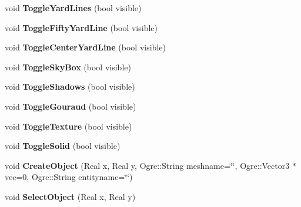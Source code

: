 \begin{DoxyCompactItemize}
\item 
\hypertarget{class_p_f_b_application_a4b296aa04f842d084c74fe3a8fe6df18}{
void {\bfseries ToggleYardLines} (bool visible)}
\label{class_p_f_b_application_a4b296aa04f842d084c74fe3a8fe6df18}

\item 
\hypertarget{class_p_f_b_application_aacff371d8a9b6d9068a855173434a7eb}{
void {\bfseries ToggleFiftyYardLine} (bool visible)}
\label{class_p_f_b_application_aacff371d8a9b6d9068a855173434a7eb}

\item 
\hypertarget{class_p_f_b_application_a6da1667cdc10e69d3ca21edfce3622f7}{
void {\bfseries ToggleCenterYardLine} (bool visible)}
\label{class_p_f_b_application_a6da1667cdc10e69d3ca21edfce3622f7}

\item 
\hypertarget{class_p_f_b_application_acd95785fc2796c2fc470238dda61abdb}{
void {\bfseries ToggleSkyBox} (bool visible)}
\label{class_p_f_b_application_acd95785fc2796c2fc470238dda61abdb}

\item 
\hypertarget{class_p_f_b_application_a461aab080d5d3e152da81627383692ba}{
void {\bfseries ToggleShadows} (bool visible)}
\label{class_p_f_b_application_a461aab080d5d3e152da81627383692ba}

\item 
\hypertarget{class_p_f_b_application_a18e5368ea7e620c6fd6a844d7124b36f}{
void {\bfseries ToggleGouraud} (bool visible)}
\label{class_p_f_b_application_a18e5368ea7e620c6fd6a844d7124b36f}

\item 
\hypertarget{class_p_f_b_application_a8a39b368b7f08d09da73f4ec82087912}{
void {\bfseries ToggleTexture} (bool visible)}
\label{class_p_f_b_application_a8a39b368b7f08d09da73f4ec82087912}

\item 
\hypertarget{class_p_f_b_application_ad89e74af65b66b3b4a9adf05c99935bb}{
void {\bfseries ToggleSolid} (bool visible)}
\label{class_p_f_b_application_ad89e74af65b66b3b4a9adf05c99935bb}

\item 
\hypertarget{class_p_f_b_application_a9a5b3ddee4927228bc3f39ca805d518f}{
void {\bfseries CreateObject} (Real x, Real y, Ogre::String meshname=\char`\"{}\char`\"{}, Ogre::Vector3 $\ast$vec=0, Ogre::String entityname=\char`\"{}\char`\"{})}
\label{class_p_f_b_application_a9a5b3ddee4927228bc3f39ca805d518f}

\item 
\hypertarget{class_p_f_b_application_a2043f2311e74dc77bbe6df5296d7d756}{
void {\bfseries SelectObject} (Real x, Real y)}
\label{class_p_f_b_application_a2043f2311e74dc77bbe6df5296d7d756}


\end{DoxyCompactItemize}
